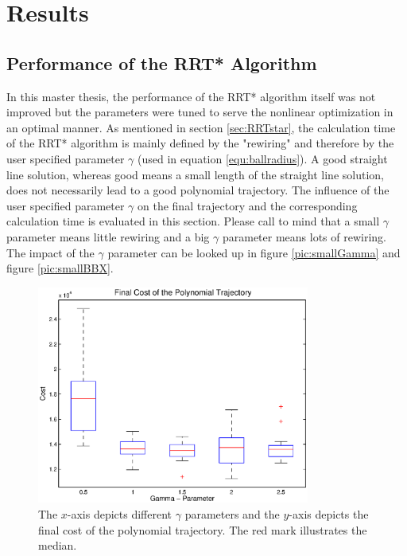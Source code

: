 \chapter{Results}\label{chap:Results}


\section{Performance of the RRT* Algorithm}

In this master thesis, the performance of the RRT* algorithm itself was not improved but the parameters were tuned to serve the nonlinear optimization in an optimal manner.\newline
As mentioned in section \ref{sec:RRTstar}, the calculation time of the RRT* algorithm is mainly defined by the "rewiring" and therefore by the user specified parameter $\gamma$ (used in equation \ref{equ:ballradius}). A good straight line solution, whereas good means a small length of the straight line solution, does not necessarily lead to a good polynomial trajectory. The influence of the user specified parameter $\gamma$ on the final trajectory and the corresponding calculation time is evaluated in this section. \newline
Please call to mind that a small $\gamma$ parameter means little rewiring and a big $\gamma$ parameter means lots of rewiring. The impact of the $\gamma$ parameter can be looked up in figure \ref{pic:smallGamma} and figure \ref{pic:smallBBX}.\newline

\begin{figure}[H]
   \centering
   \includegraphics[trim = 14mm 10mm 15mm 0mm,clip,width=0.8\textwidth]{pics/boxplot1.eps}
   \caption{The $x$-axis depicts different $\gamma$ parameters and the $y$-axis depicts the final cost of the polynomial trajectory. The red mark illustrates the median. }
   \label{pic:boxplot}
\end{figure}

